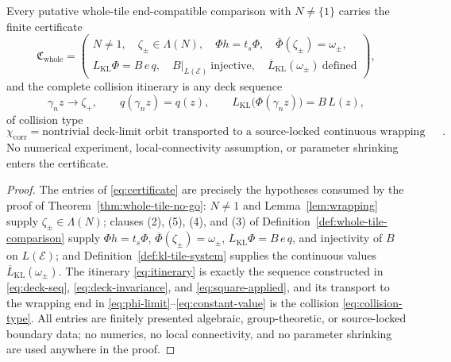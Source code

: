 \begin{proposition}\label{prop:obstruction-certificate}
Every putative whole-tile end-compatible comparison with \(N\ne\{1\}\) carries the finite certificate
\begin{equation}\label{eq:certificate}
\mathfrak C_{\mathrm{whole}}
=
\left(
\begin{array}{l}
N\ne1,\quad \zeta_\pm\in\Lambda(N),\quad \Phi h=t_s\Phi,\quad \overline\Phi(\zeta_\pm)=\omega_\pm,\\[2pt]
L_{\mathrm{KL}}\Phi=B\,e\,q,\quad B|_{L(\mathcal E)}\ \text{injective},\quad \overline L_{\mathrm{KL}}(\omega_\pm)\ \text{defined}
\end{array}
\right),
\end{equation}
and the complete collision itinerary is any deck sequence
\begin{equation}\label{eq:itinerary}
\gamma_nz\longrightarrow\zeta_+,
\qquad
q(\gamma_nz)=q(z),
\qquad
L_{\mathrm{KL}}\bigl(\Phi(\gamma_nz)\bigr)=B\,L(z),
\end{equation}
of collision type
\begin{equation}\label{eq:collision-type}
\chi_{\mathrm{corr}}=\text{nontrivial deck-limit orbit transported to a source-locked continuous wrapping end}.
\end{equation}
No numerical experiment, local-connectivity assumption, or parameter shrinking enters the certificate.
\end{proposition}

\begin{proof}
The entries of \eqref{eq:certificate} are precisely the hypotheses consumed by the proof of Theorem~\ref{thm:whole-tile-no-go}: \(N\ne1\) and Lemma~\ref{lem:wrapping} supply \(\zeta_\pm\in\Lambda(N)\); clauses (2), (5), (4), and (3) of Definition~\ref{def:whole-tile-comparison} supply \(\Phi h=t_s\Phi\), \(\overline\Phi(\zeta_\pm)=\omega_\pm\), \(L_{\mathrm{KL}}\Phi=B\,e\,q\), and injectivity of \(B\) on \(L(\mathcal E)\); and Definition~\ref{def:kl-tile-system} supplies the continuous values \(\overline L_{\mathrm{KL}}(\omega_\pm)\).  The itinerary \eqref{eq:itinerary} is exactly the sequence constructed in \eqref{eq:deck-seq}, \eqref{eq:deck-invariance}, and \eqref{eq:square-applied}, and its transport to the wrapping end in \eqref{eq:phi-limit}--\eqref{eq:constant-value} is the collision \eqref{eq:collision-type}.  All entries are finitely presented algebraic, group-theoretic, or source-locked boundary data; no numerics, no local connectivity, and no parameter shrinking are used anywhere in the proof.
\end{proof}